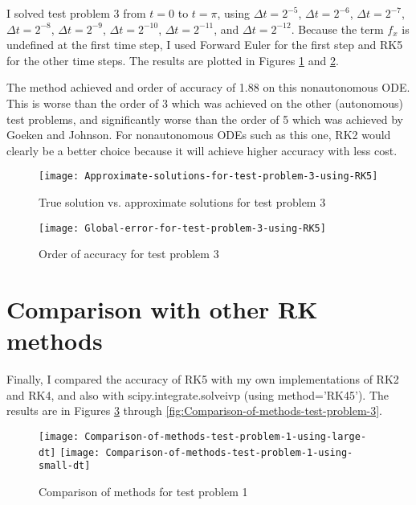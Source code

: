 \documentclass{article}
\begin{document}
I solved test problem 3 from $t = 0$ to $t = \pi$, using $\Delta t = 2^{-5}$, $\Delta t = 2^{-6}$, $\Delta t = 2^{-7}$, $\Delta t = 2^{-8}$, $\Delta t = 2^{-9}$, $\Delta t = 2^{-10}$, $\Delta t = 2^{-11}$, and $\Delta t = 2^{-12}$. Because the term $f_x$ is undefined at the first time step, I used Forward Euler for the first step and RK5 for the other time steps.  The results are plotted in Figures \ref{fig:Approximate-solutions-for-test-problem-3-using-RK5} and \ref{fig:Global-error-for-test-problem-3-using-RK5}.

The method achieved and order of accuracy of 1.88 on this nonautonomous ODE.  This is worse than the order of 3 which was achieved on the other (autonomous) test problems, and significantly worse than the order of 5 which was achieved by Goeken and Johnson. For nonautonomous ODEs such as this one, RK2 would clearly be a better choice because it will achieve higher accuracy with less cost.

\begin{figure}[H]
	\centering
	\texttt{[image: Approximate-solutions-for-test-problem-3-using-RK5]}
	\caption{True solution vs. approximate solutions for test problem 3}
	\label{fig:Approximate-solutions-for-test-problem-3-using-RK5}
\end{figure}

\begin{figure}[H]
	\centering
	\texttt{[image: Global-error-for-test-problem-3-using-RK5]}
	\caption{Order of accuracy for test problem 3}
	\label{fig:Global-error-for-test-problem-3-using-RK5}
\end{figure}

\section{Comparison with other RK methods}
Finally, I compared the accuracy of RK5 with my own implementations of RK2 and RK4, and also with scipy.integrate.solve\textunderscore ivp (using method='RK45'). The results are in Figures \ref{fig:Comparison-of-methods-test-problem-1} through \ref{fig:Comparison-of-methods-test-problem-3}.

\begin{figure}[H]
	\centering
	\texttt{[image: Comparison-of-methods-test-problem-1-using-large-dt]}
	\texttt{[image: Comparison-of-methods-test-problem-1-using-small-dt]}
	\caption{Comparison of methods for test problem 1}
	\label{fig:Comparison-of-methods-test-problem-1}
\end{figure}
\end{document}
